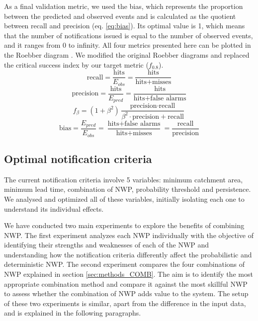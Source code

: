 \documentclass[preprint,12pt,authoryear]{elsarticle}
\begin{document}
As a final validation metric, we used the bias, which represents the proportion between the predicted and observed events and is calculated as the quotient between recall and precision  (eq. \ref{eq:bias}). Its optimal value is 1, which means that the number of notifications issued is equal to the number of observed events, and it ranges from 0 to infinity. All four metrics presented here can be plotted in the Roebber diagram \cite{Roebber2009}. We modified the original Roebber diagrams and replaced the critical success index by our target metric ($f_{0.8}$).
\begin{equation}
    \text{recall} = \frac{\text{hits}}{E_{obs}} = \frac{\text{hits}}{\text{hits} + \text{misses}}
    \label{eq:recall}
\end{equation}
\begin{equation}
    \text{precision} = \frac{\text{hits}}{E_{pred}} = \frac{\text{hits}}{\text{hits} + \text{false alarms}}
    \label{eq:precision}
\end{equation}
\begin{equation}
    f_{\beta} = \left( 1 + \beta^2 \right) \frac{\text{precision} \cdot \text{recall}}{\beta^2 \cdot \text{precision} + \text{recall}}
    \label{eq:fscore}
\end{equation}
\begin{equation}
    \text{bias} = \frac{E_{pred}}{E_{obs}} = \frac{\text{hits} + \text{false alarms}} {\text{hits} + \text{misses}} = \frac{\text{recall}}{\text{precision}}
    \label{eq:bias}
\end{equation}

\subsection{Optimal notification criteria}
\label{sec:methods_OPT}

The current notification criteria involve 5 variables: minimum catchment area, minimum lead time, combination of NWP, probability threshold and persistence. We analysed and optimized all of these variables, initially isolating each one to understand its individual effects.

We have conducted two main experiments to explore the benefits of combining NWP. The first experiment analyzes each NWP individually with the objective of identifying their strengths and weaknesses of each of the NWP and understanding how the notification criteria differently affect the probabilistic and deterministic NWP. The second experiment compares the four combinations of NWP explained in section \ref{sec:methods_COMB}. The aim is to identify the most appropriate combination method and compare it against the most skillful NWP to assess whether the combination of NWP adds value to the system. The setup of these two experiments is similar, apart from the difference in the input data, and is explained in the following paragraphs.
\end{document}

